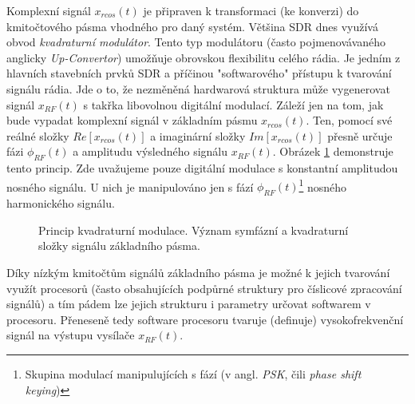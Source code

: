 \marginpar{\textcolor{txt_blue}{Up-Convertor, Transformace do pásma VF}}
Komplexní signál $x_{rcos}(t)$ je připraven k transformaci (ke konverzi) do kmitočtového pásma vhodného pro daný systém. Většina SDR dnes využívá obvod \textsl{kvadraturní modulátor}. Tento typ modulátoru (často pojmenovávaného anglicky \textsl{Up-Convertor}) umožňuje obrovskou flexibilitu celého rádia. Je jedním z hlavních stavebních prvků SDR a příčinou "softwarového" přístupu k tvarování signálu rádia. Jde o to, že nezměněná hardwarová struktura může vygenerovat signál $x_{RF}(t)$ s takřka libovolnou digitální modulací. Záleží jen na tom, jak bude vypadat komplexní signál v základním pásmu $x_{rcos}(t)$. Ten, pomocí své reálné složky $Re[x_{rcos}(t)]$ a imaginární složky $Im[x_{rcos}(t)]$ přesně určuje fázi $\phi_{RF}(t)$ a amplitudu výsledného signálu $x_{RF}(t)$. Obrázek \ref{fig_quad_principle} demonstruje tento princip. Zde uvažujeme pouze digitální modulace s konstantní amplitudou nosného signálu. U nich je manipulováno jen s fází $\phi_{RF}(t)$\footnote{Skupina modulací manipulujících s fází (v angl. \textsl{PSK}, čili \textsl{phase shift keying})} nosného harmonického signálu.
 
\begin{figure}[ht]
 \begin{minipage}[c]{0.65\textwidth}
  
 \end{minipage}\hfill
 \begin{minipage}[t]{0.3\textwidth}
  \caption{Princip kvadraturní modulace. Význam symfázní a kvadraturní složky signálu základního pásma.\label{fig_quad_principle}}
 \end{minipage}
\end{figure}


Díky nízkým kmitočtům signálů základního pásma je možné k jejich tvarování využít procesorů (často obsahujících podpůrné struktury pro číslicové zpracování signálů) a tím pádem lze jejich strukturu i parametry určovat softwarem v procesoru. Přeneseně tedy software procesoru tvaruje (definuje) vysokofrekvenční signál na výstupu vysílače $x_{RF}(t)$.



